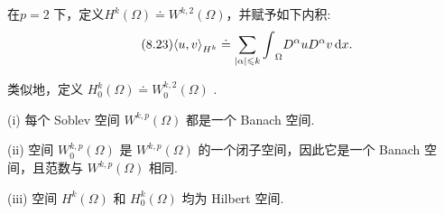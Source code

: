 \begin{definition}\label{def:hilbert-sobolev-space}
在$p = 2$ 下，定义${H}^{k}\left( \Omega \right)  \doteq  {W}^{k,2}\left( \Omega \right)$，并赋予如下内积:
\begin{equation}\tag{8.23}\label{eq:hilbert-sobolev-inner-product}
\langle u,v{\rangle }_{{H}^{k}} \doteq  \sum_{{\left| \alpha \right|  \leqslant  k}}{\int }_{\Omega }{D}^{\alpha }u{D}^{\alpha }{v\mathop{}\!\mathrm{d} x}.
\end{equation}

类似地，定义 ${H}_{0}^{k}\left( \Omega \right)  \doteq  {W}_{0}^{k,2}\left( \Omega \right)$ .
\end{definition}

\begin{theorem}[Soblev空间的基本性质]\label{thm:sobolev-basic-properties}
(i) 每个 Soblev 空间 ${W}^{k,p}\left( \Omega \right)$ 都是一个 Banach 空间.

(ii) 空间 ${W}_{0}^{k,p}\left( \Omega \right)$ 是 ${W}^{k,p}\left( \Omega \right)$ 的一个闭子空间，因此它是一个 Banach 空间，且范数与 ${W}^{k,p}\left( \Omega \right)$ 相同.

(iii) 空间 ${H}^{k}\left( \Omega \right)$ 和 ${H}_{0}^{k}\left( \Omega \right)$ 均为 Hilbert 空间.
\end{theorem}

